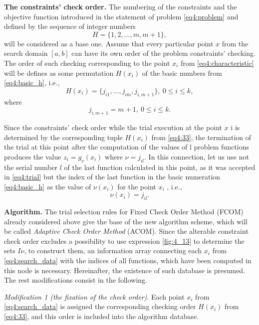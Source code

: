 \textbf{The constraints’ check order.} The numbering of the constraints and the objective function introduced in the statement of problem \eqref{eq4:problem} and defined by the sequence of integer numbers
\begin{equation}
  \label{eq4:basic_h}
  H=\{1,2,\dots,m,m+1\},
\end{equation}
will be considered as a base one.
Assume that every particular point $x$ from the search domain $[a,b]$ can have its own order of the problem constraints’ checking. The order of such checking corresponding to the point $x_i$ from \eqref{eq4:characteristic} will be defines as some permutation $H(x_i )$ of the basic numbers from \eqref{eq4:basic_h}, i.e.,
\begin{equation}
  \label{eq4:33}
  H(x_i)=\{j_{i1},\dots,j_{im},j_{i,m+1}\},\:0\le i\le k,
\end{equation}
where
\begin{equation}
  \label{eq4:34}
  j_{i,m+1}=m+1,\:0\le i\le k.
\end{equation}

Since the constraints’ check order while the trial execution at the point $x$ i is determined by the corresponding tuple $H(x_i )$ from \eqref{eq4:33}, the termination of the trial at this point after the computation of the values of l problem functions produces the value $z_i=g_\nu(x_i)$ where $\nu=j_{il}$. In this connection, let us use not the serial number $l$ of the last function calculated in this point, as it was accepted in \eqref{eq4:trial} but the index of the last function in the basic numeration \eqref{eq4:basic_h} as the
value of $\nu(x_i )$ for the point $x_i$ , i.e.,
\begin{equation}
  \label{eq4:35}
  \nu(x_i)=j_{il}.
\end{equation}

\textbf{Algorithm.} The trial selection rules for Fixed Check Order Method (FCOM) already considered above give the base of the new algorithm scheme, which will be called \emph{Adaptive
Check Order Method} (ACOM). Since the alterable constraint check order excludes a possibility to use expression \eqref{fig:4_13} to determine the sets $I\nu$, to construct them, an information array connecting each $x_i$ from \eqref{eq4:search_data} with the indices of all functions, which have been computed in this node is necessary. Hereinafter, the existence of such database is presumed. The rest modifications consist in the following.

\emph{Modification 1 (the fixation of the check order)}. Each point $x_i$ from \eqref{eq4:search_data} is assigned the corresponding checking order $H(x_i )$ from \eqref{eq4:33}, and this order is included into the algorithm database.

